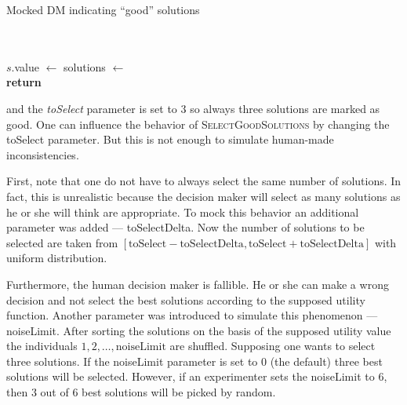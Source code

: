 \begin{algorithm}
\caption{Mocked DM indicating ``good'' solutions}\label{alg:dmselection}
  \begin{algorithmic}[1]
     \\
     \\
    \State $s.$value $\gets$ 
    \EndFor
    \State solutions $\gets$  \\
    \State \textbf{return} 
    \EndProcedure
  \end{algorithmic}
\end{algorithm}

and the \textit{toSelect} parameter is set to $3$ so always three solutions
are marked as good. One can influence the behavior of
\textsc{SelectGoodSolutions} by changing the toSelect parameter. But this is
not enough to simulate human-made inconsistencies.

First, note that one do not have to always select the same number of
solutions. In fact, this is unrealistic because the decision maker will select
as many solutions as he or she will think are appropriate. To mock this
behavior an additional parameter was added --- toSelectDelta. Now the number
of solutions to be selected are taken from $[\text{toSelect} -
  \text{toSelectDelta}, \text{toSelect} + \text{toSelectDelta}]$ with uniform
distribution.

Furthermore, the human decision maker is fallible. He or she can make a wrong
decision and not select the best solutions according to the supposed utility
function. Another parameter was introduced to simulate this phenomenon ---
noiseLimit. After sorting the solutions on the basis of the supposed utility
value the individuals $1, 2, \dots, \text{noiseLimit}$ are shuffled. Supposing
one wants to select three solutions. If the noiseLimit parameter is set to $0$
(the default) three best solutions will be selected. However, if an
experimenter sets the noiseLimit to $6$, then $3$ out of $6$ best solutions
will be picked by random.


